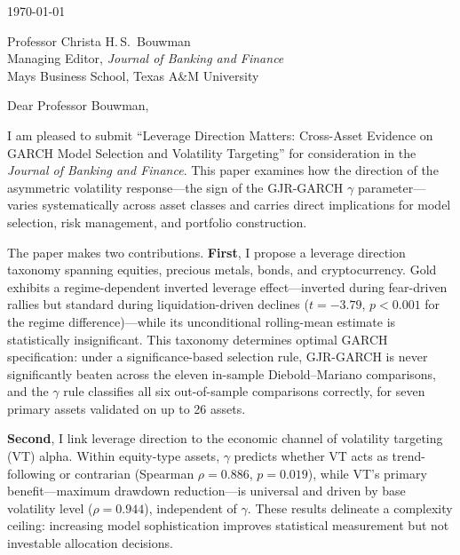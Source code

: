 \documentclass[11pt,a4paper]{article}
\begin{document}
\noindent
\today

\bigskip

\noindent
Professor Christa H.\,S.\ Bouwman\\
Managing Editor, \textit{Journal of Banking and Finance}\\
Mays Business School, Texas A\&M University

\bigskip

\noindent
Dear Professor Bouwman,

\medskip

I am pleased to submit ``Leverage Direction Matters: Cross-Asset Evidence on GARCH Model Selection and Volatility Targeting'' for consideration in the \textit{Journal of Banking and Finance}. This paper examines how the direction of the asymmetric volatility response---the sign of the GJR-GARCH $\gamma$ parameter---varies systematically across asset classes and carries direct implications for model selection, risk management, and portfolio construction.

The paper makes two contributions. \textbf{First}, I propose a leverage direction taxonomy spanning equities, precious metals, bonds, and cryptocurrency. Gold exhibits a regime-dependent inverted leverage effect---inverted during fear-driven rallies but standard during liquidation-driven declines ($t = -3.79$, $p < 0.001$ for the regime difference)---while its unconditional rolling-mean estimate is statistically insignificant. This taxonomy determines optimal GARCH specification: under a significance-based selection rule, GJR-GARCH is never significantly beaten across the eleven in-sample Diebold--Mariano comparisons, and the $\gamma$ rule classifies all six out-of-sample comparisons correctly, for seven primary assets validated on up to 26 assets.

\textbf{Second}, I link leverage direction to the economic channel of volatility targeting (VT) alpha. Within equity-type assets, $\gamma$ predicts whether VT acts as trend-following or contrarian (Spearman $\rho = 0.886$, $p = 0.019$), while VT's primary benefit---maximum drawdown reduction---is universal and driven by base volatility level ($\rho = 0.944$), independent of $\gamma$. These results delineate a complexity ceiling: increasing model sophistication improves statistical measurement but not investable allocation decisions.

\end{document}
